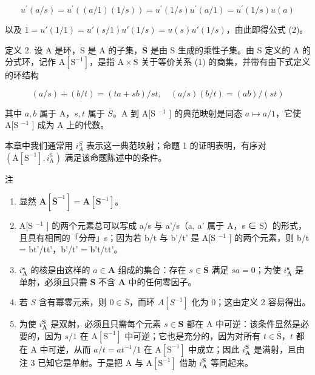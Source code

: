 \[
u ^ {\prime} (a / s) = u ^ {\prime} ((a / 1) (1 / s)) = u ^ {\prime} (1 / s) u ^ {\prime} (a / 1) = u ^ {\prime} (1 / s) u (a)
\]

以及 \(1 = u'(1/1) = u'(s/1)u'(1/s) = u(s)u'(1/s)\)，由此即得公式 (2)。

定义 2. 设 A 是环，S 是 A 的子集，\(\overline{\mathbf{S}}\) 是由 S 生成的乘性子集。由 S 定义的 A 的分式环，记作 \(\mathrm{A}[\mathrm{S}^{-1}]\)，是指 \(\mathrm{A} \times \overline{\mathrm{S}}\) 关于等价关系 (1) 的商集，并带有由下式定义的环结构

\[
(a / s) + (b / t) = (t a + s b) / s t, \quad (a / s) (b / t) = (a b) / (s t)
\]

其中 \(a, b\) 属于 A，\(s, t\) 属于 \(\bar{S}\)。A 到 A{[}S \(^{-1}\) {]} 的典范映射是同态 \(a \mapsto a/1\)，它使 A{[}S \(^{-1}\) {]} 成为 A 上的代数。

本章中我们通常用 \(i_{A}^{S}\) 表示这一典范映射；命题 1 的证明表明，有序对 \((\mathrm{A}[\mathrm{S}^{-1}], i_{\mathrm{A}}^{\mathrm{S}})\) 满足该命题陈述中的条件。

注

\begin{enumerate}
\def\labelenumi{(\arabic{enumi})}
\item
  显然 \(\mathbf{A}[\overline{\mathbf{S}}^{-1}] = \mathbf{A}[\mathbf{S}^{-1}]\)。
\item
  A{[}S \(^{-1}\) {]} 的两个元素总可以写成 a/s 与 a'/s（a, a' 属于 A，s ∈ S）的形式，且具有相同的「分母」s；因为若 b/t 与 b'/t' 是 A{[}S \(^{-1}\) {]} 的两个元素，则 b/t = bt'/tt'，b'/t' = b't/tt'。
\item
  \(i_{\mathbf{A}}^{\mathbf{s}}\) 的核是由这样的 \(a \in \mathbf{A}\) 组成的集合：存在 \(s \in \overline{\mathbf{S}}\) 满足 \(sa = 0\)；为使 \(i_{\mathbf{A}}^{\mathbf{s}}\) 是单射，必须且只需 \(\mathbf{S}\) 不含 \(\mathbf{A}\) 中的任何零因子。
\item
  若 \(S\) 含有幂零元素，则 \(0 \in \overline{S}\)，而环 \(A[S^{-1}]\) 化为 0；这由定义 2 容易得出。
\item
  为使 \(i_{\mathbf{A}}^{\mathbf{S}}\) 是双射，必须且只需每个元素 \(s \in \mathbf{S}\) 都在 A 中可逆：该条件显然是必要的，因为 \(s/1\) 在 \(\mathrm{A}[\mathrm{S}^{-1}]\) 中可逆；它也是充分的，因为对所有 \(t \in \overline{\mathrm{S}}\)，\(t\) 都在 A 中可逆，从而 \(a/t = at^{-1}/1\) 在 \(\mathrm{A}[\mathrm{S}^{-1}]\) 中成立；因此 \(i_{\mathbf{A}}^{\mathbf{S}}\) 是满射，且由注 3 已知它是单射。于是把 A 与 \(\mathrm{A}[\mathrm{S}^{-1}]\) 借助 \(i_{\mathbf{A}}^{\mathbf{S}}\) 等同起来。
\end{enumerate}

